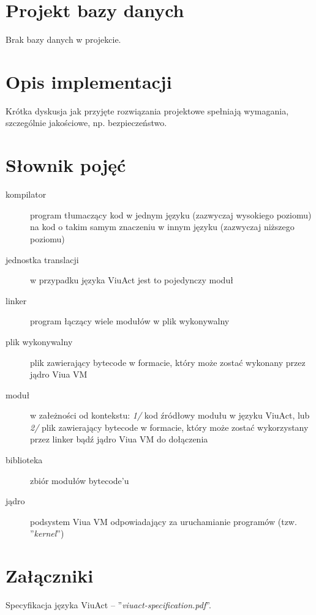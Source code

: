 \documentclass[11pt,oneside,a4paper,titlepage,onecolumn]{article}
\begin{document}
\section{Projekt bazy danych}

Brak bazy danych w projekcie.

\section{Opis implementacji}

Krótka dyskusja jak przyjęte rozwiązania projektowe spełniają wymagania, szczególnie jakościowe, np.
bezpieczeństwo.

\section{Słownik pojęć}

\begin{description}
    \item[kompilator] program tłumaczący kod w jednym języku (zazwyczaj wysokiego poziomu) na kod o takim
        samym znaczeniu w innym języku (zazwyczaj niższego poziomu)
    \item[jednostka translacji] w przypadku języka ViuAct jest to pojedynczy moduł
    \item[linker] program łączący wiele modułów w plik wykonywalny
    \item[plik wykonywalny] plik zawierający bytecode w formacie, który może zostać wykonany przez jądro Viua
        VM
    \item[moduł] w załeżności od kontekstu: \emph{1/} kod źródłowy modułu w języku ViuAct, lub \emph{2/} plik
        zawierający bytecode w formacie, który może zostać wykorzystany przez linker bądź jądro Viua VM do
        dołączenia
    \item[biblioteka] zbiór modułów bytecode'u
    \item[jądro] podsystem Viua VM odpowiadający za uruchamianie programów (tzw. ''\emph{kernel}'')
\end{description}

\section{Załączniki}

Specyfikacja języka ViuAct -- ''\emph{viuact-specification.pdf}''.
\end{document}

